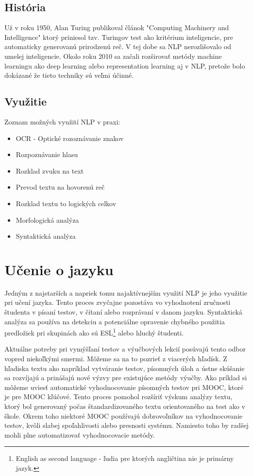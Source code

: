 \documentclass[10pt,slovak,a4paper,twoside]{article}
\begin{document}
\subsection{História}
	Už v roku 1950, Alan Turing publikoval článok "Computing Machinery and Intelligence"\cite{turing2009computing} 
	ktorý priniesol tzv. Turingov test ako kritérium inteligencie, pre automaticky generovanú 
	prirodzenú reč. V tej dobe sa NLP nerozlišovalo od umelej inteligencie.\linebreak
	Okolo roku 2010 sa začali rozširovať metódy machine learningu ako deep learning alebo 
	representation learning aj v NLP, pretože bolo dokázané že tieto techniky sú veľmi účinné.
\subsection{Využitie}
Zoznam možných využití NLP v praxi:
\begin{itemize}
	\item OCR - Optické rozoznávanie znakov
	\item Rozpoznávanie hlasu
	\item Rozklad zvuku na text
	\item Prevod textu na hovorenú reč
	\item Rozklad textu to logických celkov
	\item Morfologická analýza
	\item Syntaktická analýza
\end{itemize}
\section{Učenie o jazyku} \label{ucenie_o_jazyku}
		Jedným z najstarších a napriek tomu najaktívnejším využití NLP je jeho využitie pri učení jazyka.
	Tento proces zvyčajne pozostáva vo vyhodnotení zručnosti študenta v písaní testov, v čítaní alebo
	rozprávaní v danom jazyku. Syntaktická analýza sa používa na detekciu a potenciálne opravenie chybného použitia
	predložiek pri skupinách ako sú ESL\footnote{English as second language - ľudia pre ktorých angličtina nie je primárny jazyk.} alebo hluchý študenti.

	Aktuálne potreby pri vymýšľaní testov a výučbových lekcií posúvajú tento odbor vopred niekoľkými smermi. Môžeme sa na to pozrieť z viacerých hľadísk. 
	Z hľadiska textu ako napríklad vytváranie testov, písomných úloh a ústne skúšanie sa rozvíjajú a prinášajú nové výzvy pre existujúce metódy výučby.
	Ako príklad si môžeme uviesť automatické vyhodnocovanie písomných testov pri MOOC, ktoré je pre MOOC kľúčové. Tento proces pomohol rozšíriť výskum analýzy textu, 
	ktorý bol generovaný počas štandardizovaného textu orientovaného na test ako v škole. Okrem toho niektoré MOOC používajú dobrovoľníkov na vyhodnocovanie testov, 
	kvôli slabej spoľahlivosti alebo presnosti systému. Namiesto toho by radšej mohli plne automatizovať vyhodnocovacie metódy.
\end{document}
